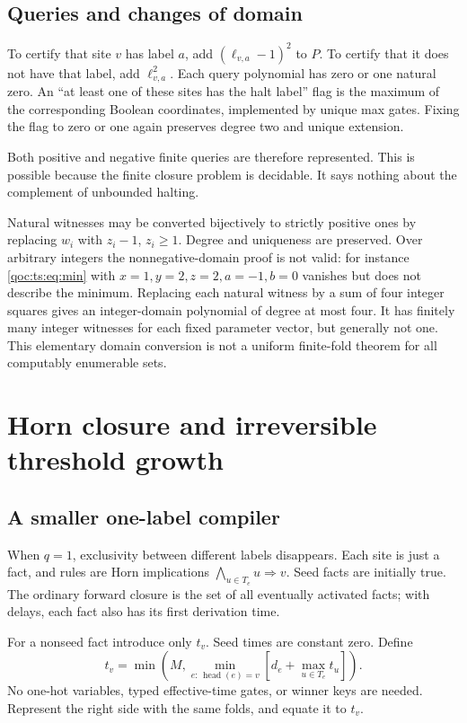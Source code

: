 \documentclass[11pt,letterpaper]{article}
\theoremstyle{definition}
\theoremstyle{remark}
\begin{document}
\subsection{Queries and changes of domain}
To certify that site $v$ has label $a$, add $(\ell_{v,a}-1)^2$ to $P$.
To certify that it does not have that label, add $\ell_{v,a}^2$. Each
query polynomial has zero or one natural zero. An ``at least one of these
sites has the halt label'' flag is the maximum of the corresponding
Boolean coordinates, implemented by unique max gates. Fixing the flag to
zero or one again preserves degree two and unique extension.

Both positive and negative finite queries are therefore represented.
This is possible because the finite closure problem is decidable. It
says nothing about the complement of unbounded halting.

Natural witnesses may be converted bijectively to strictly positive ones
by replacing $w_i$ with $z_i-1$, $z_i\ge1$. Degree and uniqueness are
preserved. Over arbitrary integers the nonnegative-domain proof is not
valid: for instance \eqref{qoc:ts:eq:min} with $x=1,y=2,z=2,a=-1,b=0$ vanishes
but does not describe the minimum. Replacing each natural witness by a
sum of four integer squares gives an integer-domain polynomial of degree
at most four. It has finitely many integer witnesses for each fixed
parameter vector, but generally not one. This elementary domain conversion
is not a uniform finite-fold theorem for all computably enumerable sets.

\section{Horn closure and irreversible threshold growth}
\subsection{A smaller one-label compiler}
When $q=1$, exclusivity between different labels disappears. Each site is
just a fact, and rules are Horn implications
$\bigwedge_{u\in T_e}u\Rightarrow v$. Seed facts are initially true.
The ordinary forward closure is the set of all eventually activated facts;
with delays, each fact also has its first derivation time.

For a nonseed fact introduce only $t_v$. Seed times are constant zero.
Define
\begin{equation}\label{qoc:ts:eq:horn}
 t_v=\min\left(M,
 \min_{e:\,\operatorname{head}(e)=v}
 \left[d_e+\max_{u\in T_e}t_u\right]\right).
\end{equation}
No one-hot variables, typed effective-time gates, or winner keys are needed.
Represent the right side with the same folds, and equate it to $t_v$.
\end{document}
